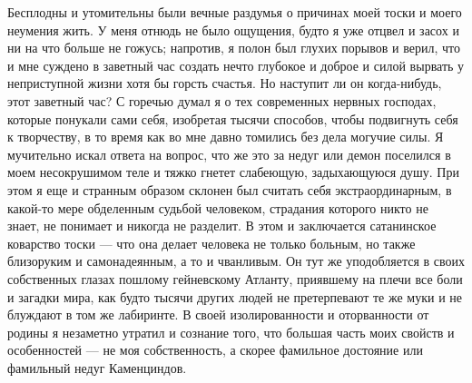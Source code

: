 Бесплодны и утомительны  были вечные раздумья о причинах  моей тоски и
моего  неумения жить.  У меня  отнюдь не  было ощущения,  будто я  уже
отцвел и  засох и ни  на что больше не  гожусь; напротив, я  полон был
глухих порывов и верил, что и мне суждено в заветный час создать нечто
глубокое и доброе и силой вырвать  у неприступной жизни хотя бы горсть
счастья. Но наступит ли он  когда-нибудь, этот заветный час? С горечью
думал  я о  тех современных  нервных господах,  которые понукали  сами
себя, изобретая  тысячи способов, чтобы подвигнуть  себя к творчеству,
в  то  время  как  во  мне  давно  томились  без  дела  могучие  силы.
Я  мучительно  искал  ответа  на  вопрос, что  же  это  за  недуг  или
демон поселился  в моем  несокрушимом теле  и тяжко  гнетет слабеющую,
задыхающуюся  душу. При  этом я  еще  и странным  образом склонен  был
считать  себя экстраординарным,  в  какой-то  мере обделенным  судьбой
человеком, страдания которого никто не знает, не понимает и никогда не
разделит.  В  этом  и  заключается  сатанинское  коварство  тоски  ---
что  она делает  человека не  только  больным, но  также близоруким  и
самонадеянным,  а то  и  чванливым.  Он тут  же  уподобляется в  своих
собственных глазах пошлому гейневскому Атланту, приявшему на плечи все
боли и загадки мира, как будто  тысячи других людей не претерпевают те
же муки  и не блуждают в  том же лабиринте. В  своей изолированности и
оторванности  от  родины я  незаметно  утратил  и сознание  того,  что
большая часть моих свойств и  особенностей --- не моя собственность, а
скорее фамильное достояние или фамильный недуг Каменциндов.

